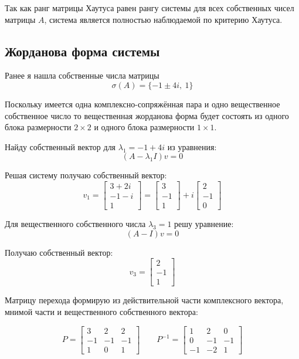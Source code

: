 \documentclass[a4paper,12pt]{article}
\begin{document}
	Так как ранг матрицы Хаутуса равен рангу системы для всех собственных чисел матрицы  \(A\), система является полностью наблюдаемой по критерию Хаутуса.
	
	
	\subsection{Жорданова форма системы}
	
	Ранее я нашла собственные числа матрицы
	\[
	\sigma(A)=\{-1 \pm 4i, \ 1\}
	\]
	
	Поскольку имеется одна комплексно-сопряжённая пара и одно вещественное собственное число то вещественная жорданова форма будет состоять из одного блока размерности $2\times2$ и одного блока размерности $1\times1$.
	
	Найду собственный вектор для $\lambda_1=-1+4i$ из уравнения:
	\[
	(A-\lambda_1 I)v=0
	\]
	
	Решая систему получаю собственный вектор:
	\[
	v_1=
	\begin{bmatrix}
		3+2i \\
		-1-i \\
		1
	\end{bmatrix}
	=
	\begin{bmatrix}
		3 \\
		-1 \\
		1
	\end{bmatrix}
	+
	i
	\begin{bmatrix}
		2 \\
		-1 \\
		0
	\end{bmatrix}
	\]
	
	Для вещественного собственного числа $\lambda_3=1$ решу уравнение:
	\[
	(A-I)v=0
	\]
	
	Получаю собственный вектор:
	\[
	v_3=
	\begin{bmatrix}
		2 \\
		-1 \\
		1
	\end{bmatrix}
	\]
	
	Матрицу перехода формирую из действительной части комплексного вектора, мнимой части и вещественного собственного вектора:
	
	\[
	P=
	\begin{bmatrix}
		3 & 2 & 2 \\
		-1 & -1 & -1 \\
		1 & 0 & 1
	\end{bmatrix}
	\qquad
	P^{-1} =
	\begin{bmatrix}
		1 & 2 & 0 \\
		0 & -1 & -1 \\
		-1 & -2 & 1
	\end{bmatrix}
	\]
	
\end{document}
